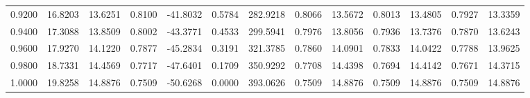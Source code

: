 \begin{tabular}{rrrrrrrrrrrrr}
0.9200 & 16.8203 & 13.6251 & 0.8100 & -41.8032 & 0.5784 & 282.9218 & 0.8066 & 13.5672 & 0.8013 & 13.4805 & 0.7927 & 13.3359 \\
0.9400 & 17.3088 & 13.8509 & 0.8002 & -43.3771 & 0.4533 & 299.5941 & 0.7976 & 13.8056 & 0.7936 & 13.7376 & 0.7870 & 13.6243 \\
0.9600 & 17.9270 & 14.1220 & 0.7877 & -45.2834 & 0.3191 & 321.3785 & 0.7860 & 14.0901 & 0.7833 & 14.0422 & 0.7788 & 13.9625 \\
0.9800 & 18.7331 & 14.4569 & 0.7717 & -47.6401 & 0.1709 & 350.9292 & 0.7708 & 14.4398 & 0.7694 & 14.4142 & 0.7671 & 14.3715 \\
1.0000 & 19.8258 & 14.8876 & 0.7509 & -50.6268 & 0.0000 & 393.0626 & 0.7509 & 14.8876 & 0.7509 & 14.8876 & 0.7509 & 14.8876 \\
\bottomrule
\end{tabular}
